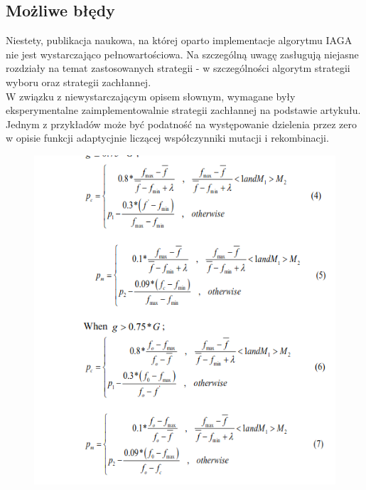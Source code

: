 \documentclass[10pt]{article}
\newenvironment{corollary}[2][Wniosek]{\begin{trivlist}
\item[\hskip \labelsep {\bfseries #1}\hskip \labelsep {\bfseries #2.}]}{\end{trivlist}}
\begin{document}
\subsection{Możliwe błędy}
Niestety, publikacja naukowa, na której oparto implementacje algorytmu IAGA nie jest wystarczająco pełnowartościowa. Na szczególną uwagę zasługują niejasne rozdziały na temat zastosowanych strategii - w szczególności algorytm strategii wyboru oraz strategii zachłannej.\\
W związku z niewystarczającym opisem słownym, wymagane były eksperymentalne zaimplementowalnie strategii zachłannej na podstawie artykułu.
Jednym z przykładów może być podatność na występowanie dzielenia przez zero w opisie funkcji adaptycjnie liczącej współczynniki mutacji i rekombinacji.
\begin{figure}[h]
\centering
\includegraphics[scale=0.5]{img/lambda.png} \\
\end{figure}


%
\end{document}
